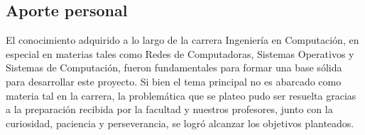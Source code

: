 \subsection{Aporte personal}

El conocimiento adquirido a lo largo de la carrera Ingeniería en Computación, en especial en materias tales como Redes de Computadoras, Sistemas Operativos y Sistemas de Computación, fueron fundamentales para formar una base sólida para desarrollar este proyecto. Si bien el tema principal no es abarcado como materia tal en la carrera, la problemática que se plateo pudo ser resuelta gracias a la preparación recibida por la facultad y nuestros profesores, junto con la curiosidad, paciencia y perseverancia, se logró alcanzar los objetivos planteados.

\newpage
